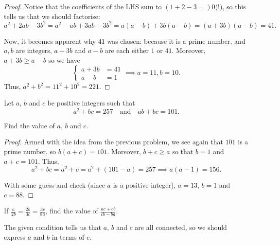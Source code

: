 \documentclass[../main.tex]{subfiles}
\begin{document}
\begin{proof}
    Notice that the coefficients of the LHS sum to $(1+2-3=)0$(!), so this tells us that we should factorise:
$$a^2+2ab-3b^2=a^2-ab+3ab-3b^2=a(a-b)+3b(a-b)=(a+3b)(a-b)=41.$$

Now, it becomes apparent why $41$ was chosen: because it is a prime number, and $a,b$ are integers, $a+3b$ and $a-b$ are each either $1$ or $41$. Moreover, $a+3b \geq a-b$ so we have
$$
\begin{cases}
    a+3b&=41 \\
    a-b&=1
\end{cases} \implies a=11, b=10.
$$
Thus, $a^2+b^2=11^2+10^2=\boxed{221}$.
\end{proof}


\begin{example}[2017 SMO(J) P20]
    Let $a$, $b$ and $c$ be positive integers such that
    $$a^2+bc=257\quad\text{and}\quad ab+bc=101.$$

    Find the value of $a$, $b$ and $c$.
\end{example}
\begin{proof}
    Armed with the idea from the previous problem, we see again that $101$ is a prime number, so $b(a+c)=101$. Moreover, $b+c\geq a$ so that $b=1$ and $a+c=101$. Thus, $$a^2+bc=a^2+c=a^2+(101-a)=257 \implies a(a-1)=156.$$

    With some guess and check (since $a$ is a positive integer), $a=13$, $b=1$ and $c=88$.
\end{proof}


\begin{example}[2016 SMO(J) P24]
    If $\frac{a}{2b}=\frac{2b}{3c}=\frac{3c}{8a}$, find the value of $\frac{ac+cb}{cb-ba}.$
\end{example}
The given condition tells us that $a$, $b$ and $c$ are all connected, so we should express $a$ and $b$ in terms of $c$.
\end{document}
